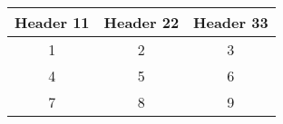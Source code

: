 \begin{tabular}{|c|c|c|}
\hline
Header 11 & Header 22 & Header 33 \\
\hline
1 & 2 & 3 \\
\hline
4 & 5 & 6 \\
\hline
7 & 8 & 9 \\
\hline
\end{tabular}